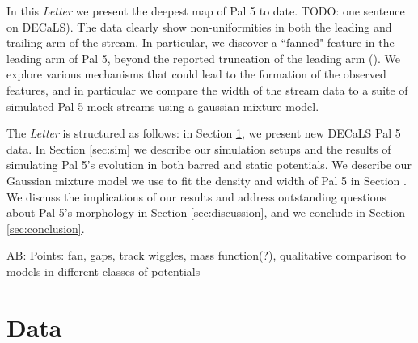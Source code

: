 \documentclass[twocolumn]{aastex62}
\newcommand{\ab}[1]{{\color{red} AB: #1}}
\newcommand{\todo}[1]{{\color{red} TODO: #1}}
\begin{document}
In this {\it Letter} we present the deepest map of Pal 5 to date. \todo{one sentence on DECaLS)}. The data clearly show non-uniformities in both the leading and trailing arm of the stream. In particular, we discover a ``fanned" feature in the leading arm of Pal 5, beyond the reported truncation of the leading arm (\citealt{Bernard:2016}). We explore various mechanisms that could lead to the formation of the observed features, and in particular we compare the width of the stream data to a suite of simulated Pal 5 mock-streams using a gaussian mixture model.

The {\it Letter} is structured as follows: in Section \ref{sec:data}, we present new DECaLS Pal 5 data. In Section \ref{sec:sim} we describe our simulation setups and the results of simulating Pal 5's evolution in both barred and static potentials. We describe our Gaussian mixture model we use to fit the density and width of Pal 5 in Section . We discuss the implications of our results and address outstanding questions about Pal 5's morphology in Section \ref{sec:discussion}, and we conclude in Section \ref{sec:conclusion}. 

\ab{Points: fan, gaps, track wiggles, mass function(?), qualitative comparison to models in different classes of potentials}



\section{Data}
\label{sec:data}
\end{document}
